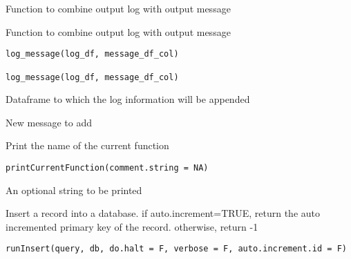 \documentclass[letterpaper]{book}
\begin{document}
%
\begin{Description}\relax
Function to combine output log with output message

Function to combine output log with output message
\end{Description}
%
\begin{Usage}
\begin{verbatim}
log_message(log_df, message_df_col)

log_message(log_df, message_df_col)
\end{verbatim}
\end{Usage}
%
\begin{Arguments}
\begin{ldescription}
\item[\code{log\_df}] Dataframe to which the log information will be appended

\item[\code{message\_df\_col}] New message to add
\end{ldescription}
\end{Arguments}
%
\begin{Description}\relax
Print the name of the current function
\end{Description}
%
\begin{Usage}
\begin{verbatim}
printCurrentFunction(comment.string = NA)
\end{verbatim}
\end{Usage}
%
\begin{Arguments}
\begin{ldescription}
\item[\code{comment.string}] An optional string to be printed
\end{ldescription}
\end{Arguments}
%
\begin{Description}\relax
Insert a record into a database. if auto.increment=TRUE, return the auto incremented
primary key of the record. otherwise, return -1
\end{Description}
%
\begin{Usage}
\begin{verbatim}
runInsert(query, db, do.halt = F, verbose = F, auto.increment.id = F)
\end{verbatim}
\end{Usage}
\end{document}
